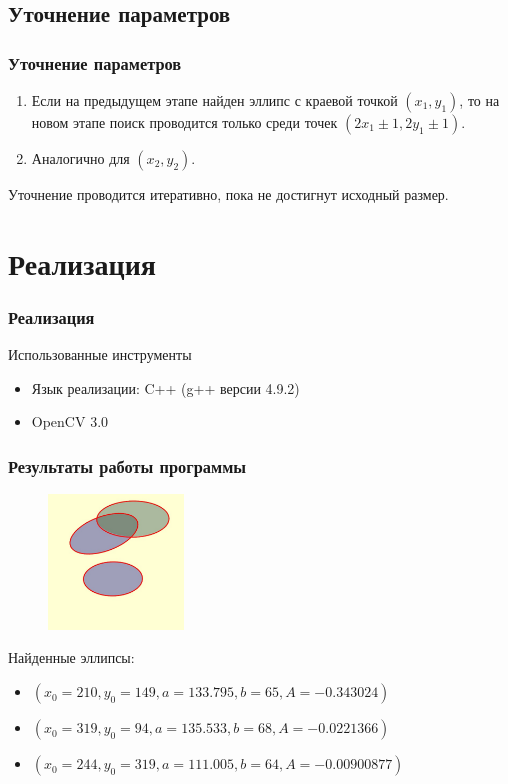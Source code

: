 \documentclass[14pt]{beamer}
\begin{document}
\subsection{Уточнение параметров}
\begin{frame}
\frametitle{Уточнение параметров}
\begin{block}{}
\begin{enumerate}
  \item Если на предыдущем этапе найден эллипс с краевой точкой \((x_1, y_1)\), то на новом этапе поиск проводится только среди точек \((2x_1 \pm 1, 2y_1 \pm 1)\).
  \item Аналогично для \((x_2, y_2)\).
\end{enumerate}
\end{block}
Уточнение проводится итеративно, пока не достигнут исходный размер.
\end{frame}

\section{Реализация}
\begin{frame}
\frametitle{Реализация}
\begin{block}{Использованные инструменты}
\begin{itemize}
  \item Язык реализации: C++ (g++ версии 4.9.2)
  \item OpenCV 3.0
\end{itemize}
\end{block}
\end{frame}


\begin{frame}
\frametitle{Результаты работы программы}
\begin{figure} 
\vspace{-3ex}
\includegraphics[width=0.32\textwidth,left]{res}
\label{fig:res}
\end{figure}
Найденные эллипсы:
\small
\begin{itemize}
  \item $(x_0 = 210, y_0 = 149, a = 133.795, b = 65, A = -0.343024)$
  \item $(x_0 = 319, y_0 = 94, a = 135.533, b = 68, A = -0.0221366)$
  \item $(x_0 = 244, y_0 = 319, a = 111.005, b = 64, A = -0.00900877)$
\end{itemize}
\normalsize
\end{frame}
\end{document}
